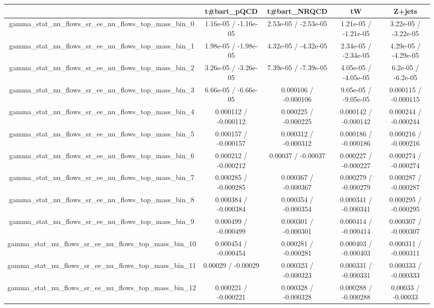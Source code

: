 \documentclass[10pt]{article}
\begin{document}
\begin{table}[htbp]
\begin{center}
\begin{tabular}{|c|c|c|c|c|}
\hline 
      & t#bar{t}_{pQCD}      & t#bar{t}_{NRQCD}      & tW      & Z+jets \\ 
\hline 
  gamma_stat_nu_flows_sr_ee_nu_flows_top_mass_bin_0 & 1.16e-05 / -1.16e-05 & 2.53e-05 / -2.53e-05 & 1.21e-05 / -1.21e-05 & 3.22e-05 / -3.22e-05 \\ 
  gamma_stat_nu_flows_sr_ee_nu_flows_top_mass_bin_1 & 1.98e-05 / -1.98e-05 & 4.32e-05 / -4.32e-05 & 2.34e-05 / -2.34e-05 & 4.29e-05 / -4.29e-05 \\ 
  gamma_stat_nu_flows_sr_ee_nu_flows_top_mass_bin_2 & 3.26e-05 / -3.26e-05 & 7.39e-05 / -7.39e-05 & 4.05e-05 / -4.05e-05 & 6.2e-05 / -6.2e-05 \\ 
  gamma_stat_nu_flows_sr_ee_nu_flows_top_mass_bin_3 & 6.66e-05 / -6.66e-05 & 0.000106 / -0.000106 & 9.05e-05 / -9.05e-05 & 0.000115 / -0.000115 \\ 
  gamma_stat_nu_flows_sr_ee_nu_flows_top_mass_bin_4 & 0.000112 / -0.000112 & 0.000225 / -0.000225 & 0.000142 / -0.000142 & 0.000244 / -0.000244 \\ 
  gamma_stat_nu_flows_sr_ee_nu_flows_top_mass_bin_5 & 0.000157 / -0.000157 & 0.000312 / -0.000312 & 0.000186 / -0.000186 & 0.000216 / -0.000216 \\ 
  gamma_stat_nu_flows_sr_ee_nu_flows_top_mass_bin_6 & 0.000212 / -0.000212 & 0.00037 / -0.00037 & 0.000227 / -0.000227 & 0.000274 / -0.000274 \\ 
  gamma_stat_nu_flows_sr_ee_nu_flows_top_mass_bin_7 & 0.000285 / -0.000285 & 0.000367 / -0.000367 & 0.000279 / -0.000279 & 0.000287 / -0.000287 \\ 
  gamma_stat_nu_flows_sr_ee_nu_flows_top_mass_bin_8 & 0.000384 / -0.000384 & 0.000354 / -0.000354 & 0.000341 / -0.000341 & 0.000295 / -0.000295 \\ 
  gamma_stat_nu_flows_sr_ee_nu_flows_top_mass_bin_9 & 0.000499 / -0.000499 & 0.000301 / -0.000301 & 0.000414 / -0.000414 & 0.000307 / -0.000307 \\ 
  gamma_stat_nu_flows_sr_ee_nu_flows_top_mass_bin_10 & 0.000454 / -0.000454 & 0.000281 / -0.000281 & 0.000403 / -0.000403 & 0.000311 / -0.000311 \\ 
  gamma_stat_nu_flows_sr_ee_nu_flows_top_mass_bin_11 & 0.00029 / -0.00029 & 0.000323 / -0.000323 & 0.000331 / -0.000331 & 0.000333 / -0.000333 \\ 
  gamma_stat_nu_flows_sr_ee_nu_flows_top_mass_bin_12 & 0.000221 / -0.000221 & 0.000328 / -0.000328 & 0.000288 / -0.000288 & 0.00033 / -0.00033 \\ 

\end{tabular}
\end{center}
\end{table}
\end{document}
